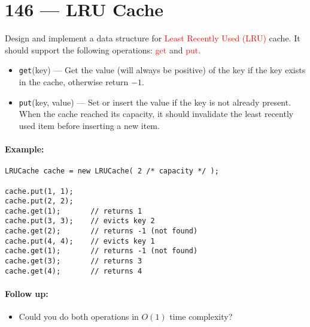 \section{146 --- LRU Cache}
Design and implement a data structure for \textcolor{red}{Least Recently Used (LRU)} cache. It should support the following operations: \textcolor{red}{get} and \textcolor{red}{put}.
\begin{itemize}
    \item \texttt{get}(key) --- Get the value (will always be positive) of the key if the key exists in the cache, otherwise return $-1$.
    \item \texttt{put}(key, value) --- Set or insert the value if the key is not already present. When the cache reached its capacity, it should invalidate the least recently used item before inserting a new item.
\end{itemize}
\paragraph{Example:}
\begin{flushleft}
\begin{lstlisting}[style=customc]
LRUCache cache = new LRUCache( 2 /* capacity */ );

cache.put(1, 1);
cache.put(2, 2);
cache.get(1);       // returns 1
cache.put(3, 3);    // evicts key 2
cache.get(2);       // returns -1 (not found)
cache.put(4, 4);    // evicts key 1
cache.get(1);       // returns -1 (not found)
cache.get(3);       // returns 3
cache.get(4);       // returns 4
\end{lstlisting}
\end{flushleft}
\paragraph{Follow up:}
\begin{itemize}
    \item Could you do both operations in $O(1)$ time complexity?
\end{itemize}
